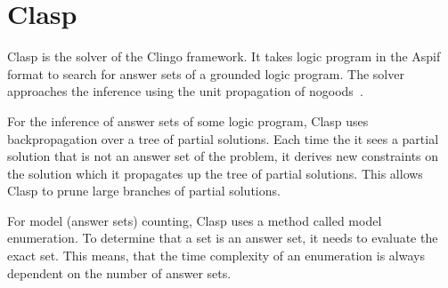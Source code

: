 \section{Clasp}\label{sec:clasp}

Clasp is the solver of the Clingo framework. It takes logic program in the Aspif
format to search for answer sets of a grounded logic program.
The solver approaches the inference using the unit propagation
of nogoods~\cite{DBLP:journals/ai/GebserKS12}.

For the inference of answer sets of some logic program,
Clasp uses backpropagation over a tree of partial solutions.
Each time the it sees a partial solution that is not an answer set
of the problem, it derives new constraints on the solution which it
propagates up the tree of partial solutions. This allows Clasp
to prune large branches of partial solutions.

For model (answer sets) counting, Clasp uses a method
called model enumeration. To determine that a set is an answer set,
it needs to evaluate the exact set. This means, that the time complexity
of an enumeration is always dependent on the number of answer sets.
